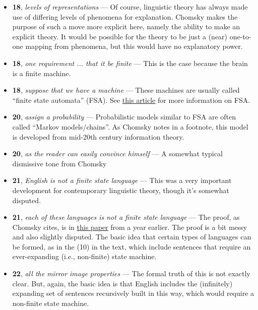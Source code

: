 \documentclass[12pt]{article}
\begin{document}
\begin{itemize}

\item \textbf{18}, \textit{levels of representations} --- Of course, linguistic theory has always made use of differing levels of phenomena for explanation. Chomsky makes the purpose of such a move more explicit here, namely the ability to make an explicit theory. It would be possible for the theory to be just a (near) one-to-one mapping from phenomena, but this would have no explanatory power.

\item \textbf{18}, \textit{one requirement ... that it be finite} --- This is the case because the brain is a finite machine.

\item \textbf{18}, \textit{suppose that we have a machine} --- These machines are usually called ``finite state automata'' (FSA). See \underline{\href{https://www.oxfordhandbooks.com/view/10.1093/oxfordhb/9780199276349.001.0001/oxfordhb-9780199276349-e-18}{this article}} for more information on FSA.

\item \textbf{20}, \textit{assign a probability} --- Probabilistic models similar to FSA are often called ``Markov models/chains''. As Chomsky notes in a footnote, this model is developed from mid-20th century information theory.

\item \textbf{20}, \textit{as the reader can easily convince himself} --- A somewhat typical dismissive tone from Chomsky

\item \textbf{21}, \textit{English is not a finite state language} --- This was a very important development for contemporary linguistic theory, though it's somewhat disputed.

\item \textbf{21}, \textit{each of these languages is not a finite state language} --- The proof, as Chomsky cites, is in \underline{\href{https://chomsky.info/wp-content/uploads/195609-.pdf}{this paper}} from a year earlier. The proof is a bit messy and also slightly disputed. The basic idea that certain types of languages can be formed, as in the (10) in the text, which include sentences that require an ever-expanding (i.e., non-finite) state machine.

\item \textbf{22}, \textit{all the mirror image properties} --- The formal truth of this is not exactly clear. But, again, the basic idea is that English includes the (infinitely) expanding set of sentences recursively built in this way, which would require a non-finite state machine.


\end{itemize}
\end{document}
